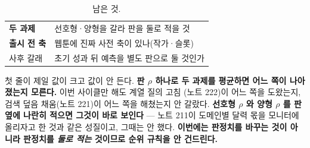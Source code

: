 \documentclass[10pt]{article}
\begin{document}

\begin{table}[t]
\centering\tsize
\caption{남은 것.}
\begin{tabular}{ll}
\toprule
\textbf{두 과제} & 선호형·양형을 갈라 판을 둘로 적을 것 \\
\textbf{출시 전 축} & 웹툰에 진짜 사전 축이 있나(작가·슬롯) \\
사후 갈래 & 초기 성과 뒤 예측을 별도 판으로 둘 것인가 \\
\bottomrule
\end{tabular}
\end{table}

첫 줄이 제일 값이 크고 값이 안 든다. \textbf{판 $\rho$ 하나로 두 과제를
평균하면 어느 쪽이 나아졌는지 모른다.} 이번 사이클만 해도 계열 질의 고침
(노트 222)이 어느 쪽을 도왔는지, 검색 덮음 채움(노트 221)이 어느 쪽을
해쳤는지 안 갈랐다. \textbf{선호형 $\rho$ 와 양형 $\rho$ 를 판 옆에 나란히
적으면 그것이 바로 보인다} --- 노트 211이 도메인별 달력 몫을 모니터에
올리자고 한 것과 같은 성질이고, 그때는 안 했다. \textbf{이번에는 판정치를
바꾸는 것이 아니라 판정치를 \emph{둘로 적는} 것이므로 순위 규칙을 안
건드린다.}
\end{document}
